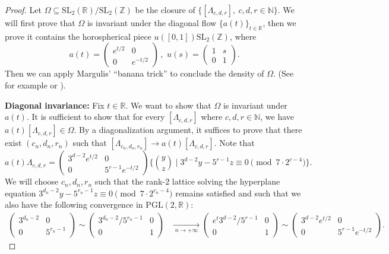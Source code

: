 \documentclass[11pt,letterpaper]{amsart}
\theoremstyle{definition}
\theoremstyle{remark}
\renewcommand{\rm}[1]{\mathrm{#1}}
\newcommand{\bb}[1]{\mathbb{#1}}
\newcommand{\R}{\bb R}
\newcommand{\Z}{\bb Z}
\newcommand{\N}{\bb N}
\newcommand{\SL}{\rm{SL}}
\begin{document}
	\begin{proof}
		
		Let $\Omega\subseteq \SL_2(\mathbb{R})/\SL_2(\Z) $ be the closure of $\{[\Lambda_{c,d,r}],\ c,d,r\in\N \}$. 
		We will first prove that $\Omega$ is invariant under the diagonal flow $\{a(t)\}_{t\in \R}$,
		then we prove it contains the horospherical piece $u([0,1])\SL_2(\Z)$, where 
		$$a(t)=\begin{pmatrix}
			e^{t/2} & 0 \\ 0 & e^{-t/2}
		\end{pmatrix}
		\,,\,\,u(s)=\begin{pmatrix}
			1 & s \\ 0 & 1
		\end{pmatrix}.$$
		Then we can apply Margulis' ``banana trick''
		to conclude the density of $\Omega$. (See for example \cite[Proposition 2.2.1 and Proposition 2.4.8]{kleinbock1996bounded} or \cite[Theorem 1.4 ]{shah_1996}).
		
		
\textbf{Diagonal invariance:}
Fix $t \in\mathbb{R}$. 
 We want to show that $\Omega$ is invariant under $a(t)$. It is sufficient to show that for every $[\Lambda_{c,d,r}]$ where $c,d,r\in \N$, we have $a(t) [\Lambda_{c,d,r}] \in \Omega$. By a diagonalization argument, it suffices to prove that there exist $(c_n,d_n,r_n)$ such that $[\Lambda_{c_n,d_n,r_n}]\rightarrow a(t)[\Lambda_{c,d,r}]$. 
Note that 
	$$a(t)\Lambda_{c,d,r} = \begin{pmatrix}
		3^{d-2}e^{t/2} & 0\\
		0 &  5^{r-1}e^{-t/2}
	\end{pmatrix} \bigg\lbrace 
	\binom{y}{z}
	\; \bigg\vert \;
	3^{d-2} y - 5^{r-1} z \equiv 0 \pmod{ 7 \cdot 2^{c-4}}
	\bigg\rbrace.$$
We will choose $c_n,d_n,r_n$ such that the rank-$2$ lattice solving the hyperplane equation $3^{d_n-2} y - 5^{r_n-1} z \equiv 0 \pmod{ 7 \cdot 2^{c_n-4}}$
remains satisfied and such that we also have the following convergence in $\mathrm{PGL}(2,\R)$: 
\begin{eqnarray}\label{eq-diagonal-convergence}
\begin{pmatrix}
 3^{d_n -2} & 0 \\
0 & 5^{r_n-1}
\end{pmatrix} \sim \begin{pmatrix}
 3^{d_n -2}/5^{r_n-1} & 0 \\
0 & 1 
\end{pmatrix}
&\xrightarrow[\; n \rightarrow +\infty \;]{} 
\begin{pmatrix}
e^{t}3^{d -2}/5^{r-1} & 0 \\
0 & 1 
\end{pmatrix} \sim
\begin{pmatrix}
3^{d -2}e^{t/2} & 0 \\
0 & 5^{r - 1}e^{-t/2}
\end{pmatrix}.
\end{eqnarray}


\end{proof}
\end{document}
